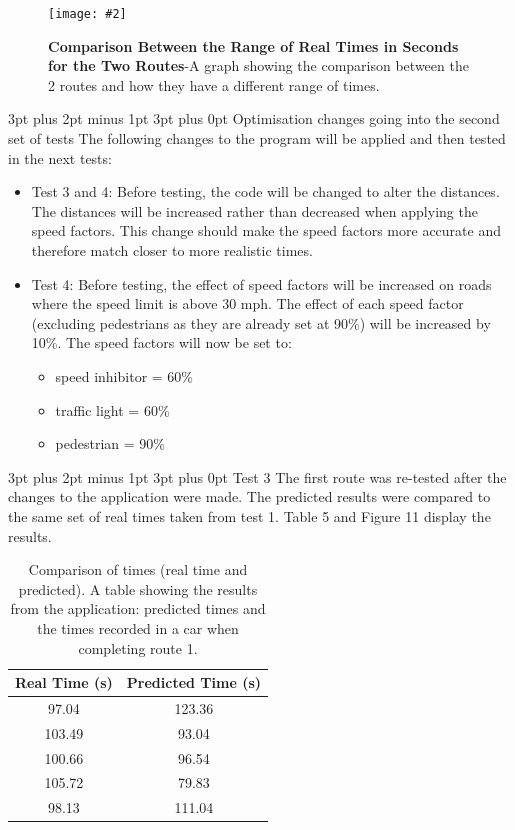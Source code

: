 \documentclass[12pt,a4paper]{article}
\makeatletter
\newcommand{\figuremacro}[5]{
    \begin{figure}[#1]
        \centering
        \texttt{[image: \#2]}
        \caption[#3]{\textbf{#3}#4}
        \label{fig:#2}
    \end{figure}
}
\renewcommand\subsection{\@startsection {subsection}{1}{0mm} %
                               {3pt plus 2pt minus 1pt} %
                               {3pt plus 0pt} %
                               {\normalfont\bfseries}}
\makeatother
\begin{document}
\figuremacro{h}{differenceBetweenTheTwoRoutes}{Comparison Between the Range of Real Times in Seconds for the Two Routes}{-A graph showing the comparison between the 2 routes and how they have a different range of times.}{0.8}

\subsection{Optimisation changes going into the second set of tests}
The following changes to the program will be applied and then tested in the next tests: 
\begin{itemize}
	\item Test 3 and 4: Before testing, the code will be changed to alter the distances. The distances will be increased rather than decreased when applying the speed factors. This change should make the speed factors more accurate and therefore match closer to more realistic times.
	
	\item Test 4: Before testing, the effect of speed factors will be increased on roads where the speed limit is above 30 mph. The effect of each speed factor (excluding pedestrians as they are already set at 90\%) will be increased by 10\%. The speed factors will now be set to:
	\begin{itemize}
		\item speed inhibitor = 60\%
		\item traffic light = 60\%
		\item pedestrian = 90\%
	\end{itemize}
\end{itemize}


\subsection{Test 3}
The first route was re-tested after the changes to the application were made. The predicted results were compared to the same set of real times taken from test 1. Table 5 and Figure 11 display the results.

\begin{table}[h]
	\centering
	\caption{Comparison of times (real time and predicted). A table showing the results from the application: predicted times and the times recorded in a car when completing route 1.}

	\begin{tabular}{@{}cc@{}}
		\toprule
		Real Time (s) & Predicted Time (s) \\ \midrule
		97.04         & 123.36             \\
		103.49        & 93.04              \\
		100.66        & 96.54              \\
		105.72        & 79.83              \\
		98.13         & 111.04             \\ \bottomrule
	\end{tabular}
\end{table}
\end{document}
